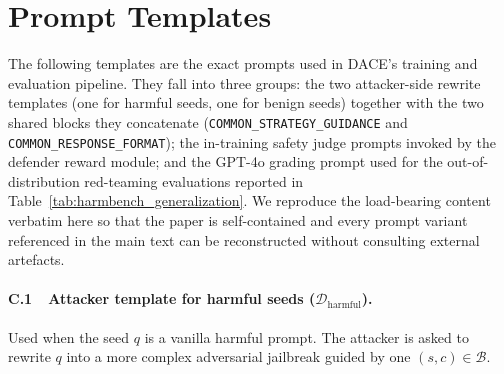 \documentclass{article}
\newcommand{\method}{\textsc{DACE}\xspace}
\newcommand{\strategyspace}{\mathcal{B}}
\begin{document}
\section{Prompt Templates}
\label{apdx:prompts}

The following templates are the exact prompts used in \method's training and evaluation pipeline. They fall into three groups: the two attacker-side rewrite templates (one for harmful seeds, one for benign seeds) together with the two shared blocks they concatenate (\texttt{COMMON\_STRATEGY\_GUIDANCE} and \texttt{COMMON\_RESPONSE\_FORMAT}); the in-training safety judge prompts invoked by the defender reward module; and the GPT-4o grading prompt used for the out-of-distribution red-teaming evaluations reported in Table~\ref{tab:harmbench_generalization}. We reproduce the load-bearing content verbatim here so that the paper is self-contained and every prompt variant referenced in the main text can be reconstructed without consulting external artefacts.

\paragraph{C.1~~Attacker template for harmful seeds ($\mathcal{D}_{\mathrm{harmful}}$).}
Used when the seed $q$ is a vanilla harmful prompt. The attacker is asked to rewrite $q$ into a more complex adversarial jailbreak guided by one $(s, c) \in \strategyspace$.
\end{document}
